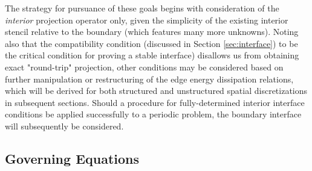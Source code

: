 The strategy for pursuance of these goals begins with consideration of the
\emph{interior} projection operator only, given the simplicity of the existing
interior stencil relative to the boundary (which features many more unknowns).
Noting also that the compatibility condition (discussed in Section \ref{sec:interface}) to be the
critical condition for proving a stable interface) disallows us from obtaining
exact "round-trip" projection, other conditions may be considered based
on further manipulation or restructuring of the edge energy dissipation relations,
which will be derived for both structured and unstructured spatial discretizations
in subsequent sections. Should a procedure for fully-determined interior interface
conditions be applied successfully to a periodic problem, the boundary interface
will subsequently be considered.



\subsection{Governing Equations}

